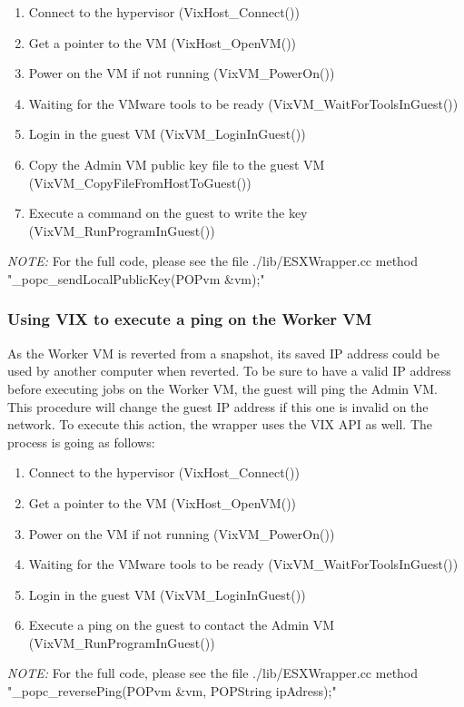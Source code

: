 \begin{enumerate}
\item Connect to the hypervisor (VixHost\_Connect())
\item Get a pointer to the VM (VixHost\_OpenVM())
\item Power on the VM if not running (VixVM\_PowerOn())
\item Waiting for the VMware tools to be ready (VixVM\_WaitForToolsInGuest())
\item Login in the guest VM (VixVM\_LoginInGuest())
\item Copy the Admin VM public key file to the guest VM (VixVM\_CopyFileFromHostToGuest())
\item Execute a command on the guest to write the key (VixVM\_RunProgramInGuest())
\end{enumerate}\s

\textit{NOTE:} For the full code, please see the file ./lib/ESXWrapper.cc method "\_popc\_sendLocalPublicKey(POPvm \&vm);"

\subsubsection{Using VIX to execute a ping on the Worker VM}
As the Worker VM is reverted from a snapshot, its saved IP address could be used by another computer when reverted. To be sure to have a valid IP address before executing jobs on the Worker VM, the guest will ping the Admin VM. This procedure will change the guest IP address if this one is invalid on the network. To execute this action, the wrapper uses the VIX API as well. The process is going as follows: 

\begin{enumerate}
\item Connect to the hypervisor (VixHost\_Connect())
\item Get a pointer to the VM (VixHost\_OpenVM())
\item Power on the VM if not running (VixVM\_PowerOn())
\item Waiting for the VMware tools to be ready (VixVM\_WaitForToolsInGuest())
\item Login in the guest VM (VixVM\_LoginInGuest())
\item Execute a ping on the guest to contact the Admin VM (VixVM\_RunProgramInGuest())
\end{enumerate}\s

\textit{NOTE:} For the full code, please see the file ./lib/ESXWrapper.cc method "\_popc\_reversePing(POPvm \&vm, POPString ipAdress);"



